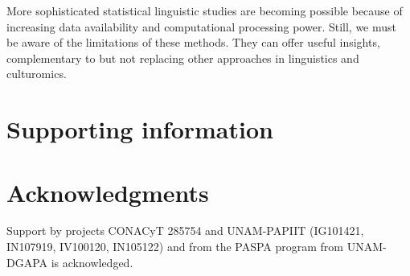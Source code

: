 \documentclass[10pt,letterpaper]{article} %
\begin{document}
More sophisticated statistical linguistic studies are becoming possible because of increasing data availability and computational processing power. Still, we must be aware of the limitations of these methods. They can offer useful insights, complementary to but not replacing other approaches in linguistics and culturomics.

\section*{Supporting information} %
\section*{Acknowledgments} %

\nolinenumbers

Support by projects CONACyT 285754 and UNAM-PAPIIT (IG101421, IN107919, IV100120, IN105122) and from the PASPA program from UNAM-DGAPA is acknowledged. 
 
\end{document}
